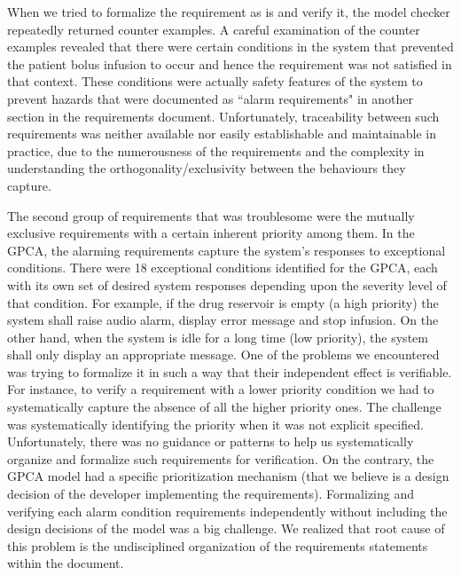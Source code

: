 When we tried to formalize the requirement as is and verify it, the model checker repeatedly returned counter examples. A careful examination of the counter examples revealed that there were certain conditions in the system that prevented the patient bolus infusion to occur and hence the requirement was not satisfied in that context. These conditions were actually safety features of the system to prevent hazards that were documented as ``alarm requirements" in another section in the requirements document.  Unfortunately, traceability between such requirements was neither available nor easily establishable and maintainable in practice, due to the numerousness of the requirements and the complexity in understanding the orthogonality/exclusivity between the behaviours they capture.

The second group of requirements that was troublesome were the mutually exclusive requirements with a certain inherent priority among them. In the GPCA, the alarming requirements capture the system's responses to exceptional conditions. There were 18 exceptional conditions identified for the GPCA, each with its own set of desired system responses depending upon the severity level of that condition. For example, if the drug reservoir is empty (a high priority) the system shall raise audio alarm, display error message and stop infusion. On the other hand, when the system is idle for a long time (low priority), the system shall only display an appropriate message. One of the problems we encountered was trying to formalize it in such a way that their independent effect is verifiable. For instance, to verify a requirement with a lower priority condition we had to systematically capture the absence of all the higher priority ones. The challenge was systematically identifying the priority when it was not explicit specified. Unfortunately, there was no guidance or patterns to help us systematically organize and formalize such requirements for verification. On the contrary, the GPCA model had a specific prioritization mechanism (that we believe is a design decision of the developer implementing the requirements). Formalizing and verifying each alarm condition requirements independently without including the design decisions of the model was a big challenge. We realized that root cause of this problem is the undisciplined organization of the requirements statements within the document.
